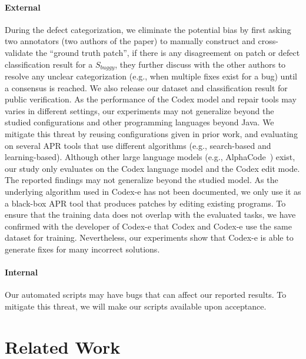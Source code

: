 \paragraph*{External} During the defect categorization, we eliminate the potential bias by first asking two annotators (two authors of the paper) to manually construct and cross-validate the ``ground truth patch'', if there is any disagreement on patch or defect classification result for a $S_{buggy}$, they further discuss with the other authors to resolve any unclear categorization (e.g., when multiple fixes exist for a bug) until a consensus is reached. We also release our dataset and classification result for public verification. As the performance of the Codex model and repair tools may varies in different settings, our experiments may not generalize beyond the studied configurations and other programming languages beyond Java. We mitigate this threat by reusing configurations given in prior work, and evaluating on several APR tools that use different algorithms (e.g., search-based and learning-based). Although other large language models (e.g., AlphaCode~\cite{alphacode}) exist, our study only evaluates on the Codex language model and the Codex edit mode. The reported findings may not generalize beyond the studied model. As the underlying algorithm used in Codex-e has not been documented, we only use it as a black-box APR tool that produces patches by editing existing programs. To ensure that the training data does not overlap with the evaluated tasks, we have confirmed with the developer of Codex-e that Codex and Codex-e use the same dataset for training. Nevertheless, our experiments show that Codex-e is able to generate fixes for many incorrect solutions. 

\paragraph*{Internal} Our automated scripts may have bugs that can affect our reported results. To mitigate this threat, we will make our scripts available upon acceptance. 

\section{Related Work}

